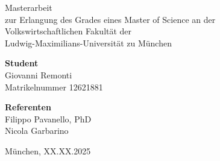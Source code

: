 
\begin{titlepage}


\vfill

\large
Masterarbeit\\

zur Erlangung des Grades eines Master of Science an der\\
Volkswirtschaftlichen Fakultät der\\
Ludwig-Maximilians-Universität zu München\\

\vfill

\begin{multicols}{2}
\raggedright
\textbf{Student}\\
Giovanni Remonti\\
Matrikelnummer 12621881

\columnbreak

\begin{flushright}
\textbf{Referenten}\\
Filippo Pavanello, PhD\\
Nicola Garbarino
\end{flushright}
\end{multicols}

\vfill

\begin{flushright}
München, XX.XX.2025
\end{flushright}

\end{titlepage}


